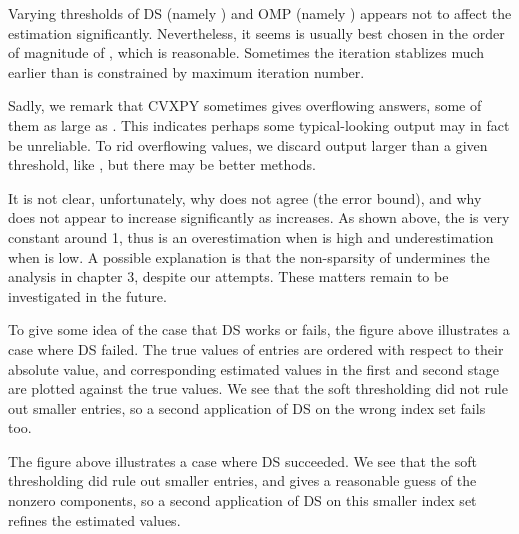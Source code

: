 Varying thresholds of DS (namely ) and OMP (namely ) appears not to affect the estimation significantly.
Nevertheless, it seems  is usually best chosen in the order of magnitude of \m {\s}, which is reasonable.
Sometimes the iteration stablizes much earlier than is constrained by maximum iteration number.

Sadly, we remark that CVXPY sometimes gives overflowing answers, some of them as large as .
This indicates perhaps some typical-looking output may in fact be unreliable.
To rid overflowing values, we discard output larger than a given threshold, like , but there may be better methods.

It is not clear, unfortunately, why \m {\T {\chi}} does not agree \m {\chi} (the error bound), and why \m {\chi} does not appear to increase significantly as \m {\s} increases.
As shown above, the \m {\chi} is very constant around 1, thus \m {\T {\chi}} is an overestimation when \m {\s} is high and underestimation when \m {\s} is low.
A possible explanation is that the non-sparsity of  undermines the analysis in chapter 3, despite our attempts.
These matters remain to be investigated in the future.

\blank [big]

To give some idea of the case that DS works or fails, the figure above illustrates a case where DS failed.
The true values of  entries are ordered with respect to their absolute value, and corresponding estimated values in the first and second stage are plotted against the true values.
We see that the soft thresholding did not rule out smaller entries, so a second application of DS on the wrong index set fails too.

\blank [big]

The figure above illustrates a case where DS succeeded.
We see that the soft thresholding did rule out smaller entries, and gives a reasonable guess of the nonzero components, so a second application of DS on this smaller index set refines the estimated values.

\stopsection

\startsection [title={Complexity}]

\startsubsection [title={Asymtotic Analysis}]

